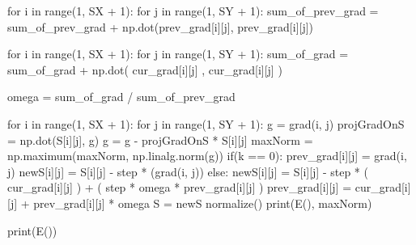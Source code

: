\documentclass[ 12pt,x11names]{article}
\begin{document}
\begin{python}
    for i in range(1, SX + 1):
        for j in range(1, SY + 1):
            sum_of_prev_grad = sum_of_prev_grad +
            np.dot(prev_grad[i][j], prev_grad[i][j])

    for i in range(1, SX + 1):
        for j in range(1, SY + 1):
            sum_of_grad = sum_of_grad +
            np.dot( cur_grad[i][j] ,  cur_grad[i][j] )

    omega = sum_of_grad / sum_of_prev_grad

    for i in range(1, SX + 1):
        for j in range(1, SY + 1):
            g = grad(i,  j)
            projGradOnS = np.dot(S[i][j], g)
            g = g - projGradOnS * S[i][j]
            maxNorm = np.maximum(maxNorm, np.linalg.norm(g))
            if(k == 0):
                prev_grad[i][j] = grad(i, j)
                newS[i][j] = S[i][j] -
                step * (grad(i, j))
            else:
                newS[i][j] = S[i][j] - step * ( cur_grad[i][j] )
                + ( step * omega *  prev_grad[i][j] )
                prev_grad[i][j] =  cur_grad[i][j]  +
                prev_grad[i][j] * omega
    S = newS
    normalize()
    print(E(), maxNorm)

print(E())
 \end{python}
\end{document}
